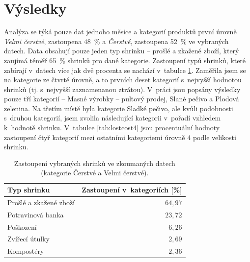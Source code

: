 


\section{Výsledky}

Analýza se týká pouze dat jednoho měsíce a kategorií produktů první úrovně \emph{Velmi čerstvé}, zastoupena 48~\% a \emph{Čerstvé}, zastoupena 52~\% ve vybraných datech. Data obsahují pouze jeden typ shrinku -- prošlé a zkažené zboží, který zaujímá téměř 65~\% shrinků pro dané kategorie. Zastoupení typů shrinků, které zabírají v~datech více jak dvě procenta se nachází v~tabulce \ref*{tab:shrinkyZastoupeni}.
Zaměřila jsem se na kategorie ze čtvrté úrovně, a to prvních deset kategorií s~nejvyšší hodnotou shrinků (tj. s~nejvyšší zaznamenanou ztrátou). V~práci jsou popsány výsledky pouze tří kategorií -- Masné výrobky -- pultový prodej, Slané pečivo a Plodová zelenina. Na třetím místě byla kategorie Sladké pečivo, ale kvůli podobnosti s~druhou kategorií, jsem zvolila následující kategorii v~pořadí vzhledem k~hodnotě shrinku.
V~tabulce \ref*{tab:lostcost4} jsou procentuální hodnoty zastoupení čtyř kategorií mezi ostatními kategoriemi úrovně 4 podle velikosti shrinku. 

\begin{table}[h!]
    \begin{center}
            \captionsetup{justification=centering}
    \caption{Zastoupení vybraných shrinků ve zkoumaných datech \\(kategorie Čerstvé a Velmi čerstvé).}
    \begin{tabular}{l r}
        Typ shrinku & Zastoupení v~kategoriích [\%]\\
        \midrule
        Prošlé a zkažené zboží & $64{,}97$ \\
        Potravinová banka & $23{,}72$ \\
        Poškození & $6{,}26$ \\
        Zvířecí útulky & $2{,}69$ \\
        Kompostéry &  $2{,}36$ \\
        \end{tabular}
    \label{tab:shrinkyZastoupeni}
\end{center}
\end{table}

